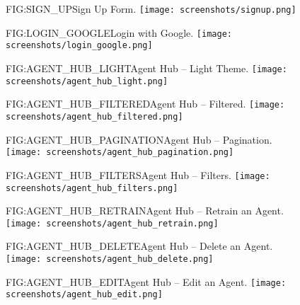 \begin{figure}[Sign Up Form]{FIG:SIGN_UP}{Sign Up Form.}
    \texttt{[image: screenshots/signup.png]}
\end{figure}

\begin{figure}[Login with Google]{FIG:LOGIN_GOOGLE}{Login with Google.}
    \texttt{[image: screenshots/login\_google.png]}
\end{figure}

\begin{figure}[Agent Hub -- Light Theme]{FIG:AGENT_HUB_LIGHT}{Agent Hub -- Light Theme.}
    \texttt{[image: screenshots/agent\_hub\_light.png]}
\end{figure}

\begin{figure}[Agent Hub -- Filtered]{FIG:AGENT_HUB_FILTERED}{Agent Hub -- Filtered.}
    \texttt{[image: screenshots/agent\_hub\_filtered.png]}
\end{figure}

\begin{figure}[Agent Hub -- Pagination]{FIG:AGENT_HUB_PAGINATION}{Agent Hub -- Pagination.}
    \texttt{[image: screenshots/agent\_hub\_pagination.png]}
\end{figure}

\begin{figure}[Agent Hub -- Filters]{FIG:AGENT_HUB_FILTERS}{Agent Hub -- Filters.}
    \texttt{[image: screenshots/agent\_hub\_filters.png]}
\end{figure}

\begin{figure}[Agent Hub -- Retrain an Agent]{FIG:AGENT_HUB_RETRAIN}{Agent Hub -- Retrain an Agent.}
    \texttt{[image: screenshots/agent\_hub\_retrain.png]}
\end{figure}

\begin{figure}[Agent Hub -- Delete an Agent]{FIG:AGENT_HUB_DELETE}{Agent Hub -- Delete an Agent.}
    \texttt{[image: screenshots/agent\_hub\_delete.png]}
\end{figure}

\begin{figure}[Agent Hub -- Edit an Agent]{FIG:AGENT_HUB_EDIT}{Agent Hub -- Edit an Agent.}
    \texttt{[image: screenshots/agent\_hub\_edit.png]}
\end{figure}

